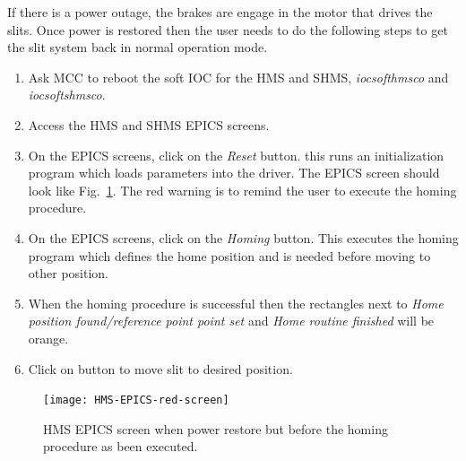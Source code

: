 {If there is a power outage, the brakes are engage in the motor that drives the slits. Once power is restored then the user needs to do the
following steps to get the slit system back in normal operation mode.
\begin{enumerate}
\item Ask MCC to reboot the soft IOC for the HMS and SHMS, {\it  iocsofthmsco} and {\it iocsoftshmsco}.
\item Access the HMS and SHMS EPICS screens.
\item On the EPICS screens, click on the {\it Reset} button. this runs an initialization program which loads parameters into the driver. The EPICS screen should look like Fig.~\ref{fig:red-screen-epics}. The red warning is to remind the user to execute the homing procedure.
\item On the EPICS screens, click on the {\it Homing} button. This executes the homing program which defines the home position and is needed before moving to other position.
\item When the homing procedure is successful then the rectangles next to {\it Home position found/reference point point set} and {\it Home routine finished} will be orange.
\item Click on button to move slit to desired position.
\end{enumerate}
\begin{figure}
\texttt{[image: HMS-EPICS-red-screen]}
\caption{HMS EPICS screen when power restore but before the homing procedure as been executed. \label{fig:red-screen-epics}}
\end{figure}








}

